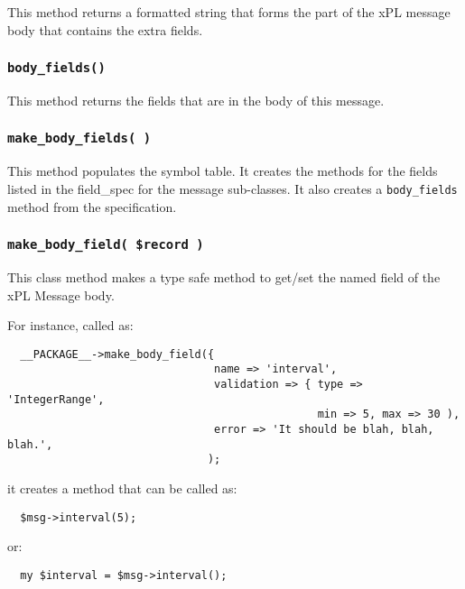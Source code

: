 \documentclass[12pt,a4paper]{article}
\begin{document}
This method returns a formatted string that forms the part of the xPL
message body that contains the extra fields.

\subsubsection*{\texttt{body\_fields()}\label{xPL::Message_body_fields_}}


This method returns the fields that are in the body of this message.

\subsubsection*{\texttt{make\_body\_fields( )}\label{xPL::Message_make_body_fields_}}


This method populates the symbol table.  It creates the methods for
the fields listed in the \textsf{field\_spec} for the message sub-classes.
It also creates a \texttt{body\_fields} method from the specification.

\subsubsection*{\texttt{make\_body\_field( \$record )}\label{xPL::Message_make_body_field_record_}}


This class method makes a type safe method to get/set the named field
of the xPL Message body.



For instance, called as:

\begin{verbatim}
  __PACKAGE__->make_body_field({
                                name => 'interval',
                                validation => { type => 'IntegerRange',
                                                min => 5, max => 30 ),
                                error => 'It should be blah, blah, blah.',
                               );
\end{verbatim}


it creates a method that can be called as:

\begin{verbatim}
  $msg->interval(5);
\end{verbatim}


or:

\begin{verbatim}
  my $interval = $msg->interval();
\end{verbatim}
\end{document}
